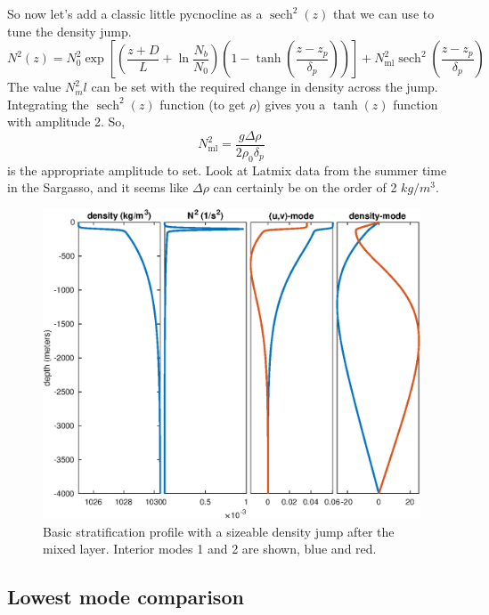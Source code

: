 \documentclass{article}
\DeclareMathOperator{\sech}{sech}
\begin{document}
So now let's add a classic little pycnocline as a $\sech^2(z)$ that we can use to tune the density jump.
\begin{equation}
    N^2(z) = N_0^2 \exp \left[ \left( \frac{z+D}{L} + \ln \frac{N_b}{N_0} \right)\left( 1-\tanh\left(\frac{z-z_p}{\delta_p}\right) \right) \right] + N_\textrm{ml}^2 \sech^2 \left(\frac{z-z_p}{\delta_p}\right)
\end{equation}{}
The value $N^2_ml$ can be set with the required change in density across the jump. Integrating the $\sech^2(z)$ function (to get $\rho$) gives you a $\tanh(z)$ function with amplitude 2. So,
\begin{equation}
    N_\textrm{ml}^2 = \frac{g \Delta \rho }{2 \rho_0 \delta_p}
\end{equation}{}
is the appropriate amplitude to set. Look at Latmix data from the summer time in the Sargasso, and it seems like $\Delta \rho$ can certainly be on the order of 2 $kg/m^3$.
\begin{figure}
\vspace{-30pt}
    \includegraphics[width=1.0\textwidth]{ModesWithDeltaRho3}
  \caption{Basic stratification profile with a sizeable density jump after the mixed layer. Interior modes 1 and 2 are shown, blue and red.}
  \label{modes-no-deltarho}
\end{figure}

%
\subsection{Lowest mode comparison}
%
\end{document}
